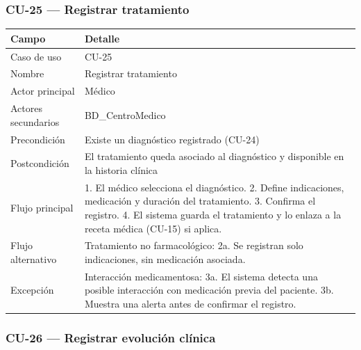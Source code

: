 \documentclass[11pt,a4paper]{article}
\begin{document}
	\subsubsection{CU-25 --- Registrar tratamiento}
	
	\begin{longtable}{p{} p{} }
		\toprule
		\textbf{Campo} & \textbf{Detalle} \\
		\midrule
		\endhead
		Caso de uso & CU-25 \\
		Nombre & Registrar tratamiento \\
		Actor principal & Médico \\
		Actores secundarios & BD\_CentroMedico \\
		Precondición & Existe un diagnóstico registrado (CU-24) \\
		Postcondición & El tratamiento queda asociado al diagnóstico y disponible en la historia clínica \\
		Flujo principal & 1. El médico selecciona el diagnóstico. 2. Define indicaciones, medicación y duración del tratamiento. 3. Confirma el registro. 4. El sistema guarda el tratamiento y lo enlaza a la receta médica (CU-15) si aplica. \\
		Flujo alternativo & Tratamiento no farmacológico: 2a. Se registran solo indicaciones, sin medicación asociada. \\
		Excepción & Interacción medicamentosa: 3a. El sistema detecta una posible interacción con medicación previa del paciente. 3b. Muestra una alerta antes de confirmar el registro. \\
		\bottomrule
	\end{longtable}
	
	\subsubsection{CU-26 --- Registrar evolución clínica}
	
\end{document}
